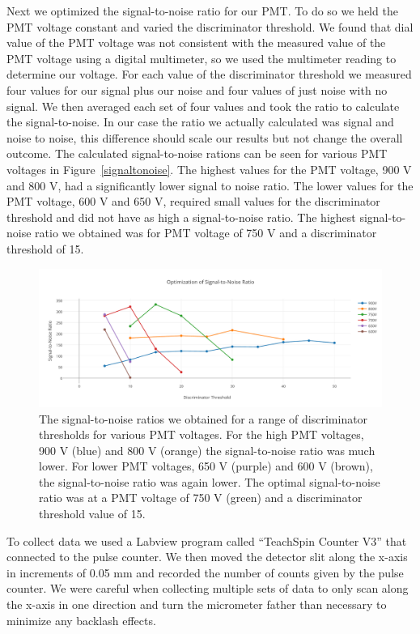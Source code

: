 \documentclass[prb,preprint]{revtex4-1}
\begin{document}
Next we optimized the signal-to-noise ratio for our PMT. To do so we held the PMT voltage constant and varied the discriminator threshold. We found that dial value of the PMT voltage was not consistent with the measured value of the PMT voltage using a digital multimeter, so we used the multimeter reading to determine our voltage. For each value of the discriminator threshold we measured four values for our signal plus our noise and four values of just noise with no signal. We then averaged each set of four values and took the ratio to calculate the signal-to-noise. In our case the ratio we actually calculated was signal and noise to noise, this difference should scale our results but not change the overall outcome. The calculated signal-to-noise rations can be seen for various PMT voltages in Figure~\ref{signaltonoise}. The highest values for the PMT voltage, 900 V and 800 V, had a significantly lower signal to noise ratio. The lower values for the PMT voltage, 600 V and 650 V, required small values for the discriminator threshold and did not have as high a signal-to-noise ratio. The highest signal-to-noise ratio we obtained was for PMT voltage of 750 V and a discriminator threshold of 15.

\begin{figure}[h!]
\centering
\includegraphics[width=6in]{signaltonoise.pdf}
\caption{The signal-to-noise ratios we obtained for a range of discriminator thresholds for various PMT voltages. For the high PMT voltages, 900 V (blue) and 800 V (orange) the signal-to-noise ratio was much lower. For lower PMT voltages, 650 V (purple) and 600 V (brown), the signal-to-noise ratio was again lower. The optimal signal-to-noise ratio was at a PMT voltage of 750 V (green) and a discriminator threshold value of 15.}
\label{signaltoniose}
\end{figure}

To collect data we used a Labview program called ``TeachSpin Counter V3'' that connected to the pulse counter. We then moved the detector slit along the x-axis in increments of 0.05 mm and recorded the number of counts given by the pulse counter. We were careful when collecting multiple sets of data to only scan along the x-axis in one direction and turn the micrometer father than necessary to minimize any backlash effects.
\end{document}
